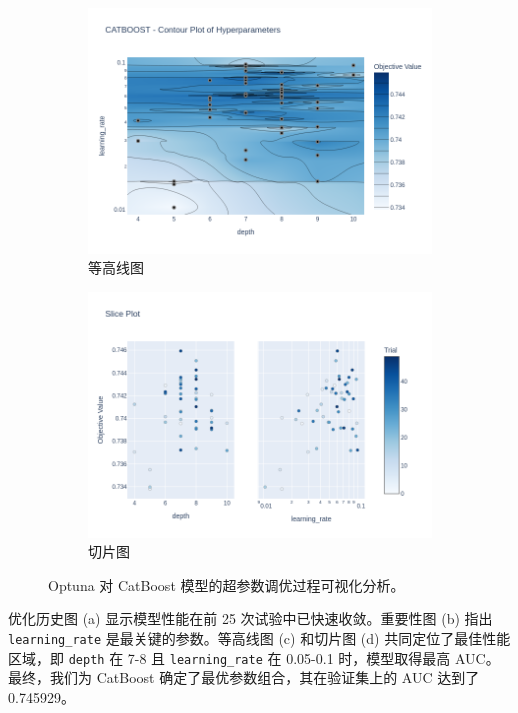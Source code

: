 \documentclass{thuemp}
\begin{document}
\begin{figure}[H]
    \vspace{0.5cm}

    \begin{subfigure}[b]{0.49\textwidth}
        \centering
        \includegraphics[width=\textwidth]{image/results/catboost_contour_plot.png} %
        \caption{等高线图}
        \label{fig:cat_contour}
    \end{subfigure}
    \hfill
    \begin{subfigure}[b]{0.49\textwidth}
        \centering
        \includegraphics[width=\textwidth]{image/results/catboost_param_vs_target_slice.png} %
        \caption{切片图}
        \label{fig:cat_slice}
    \end{subfigure}
    
    \caption{Optuna 对 CatBoost 模型的超参数调优过程可视化分析。}
    \label{fig:optuna_catboost}
\end{figure}
优化历史图 (a) 显示模型性能在前 25 次试验中已快速收敛。重要性图 (b) 指出 \texttt{learning\_rate} 是最关键的参数。等高线图 (c) 和切片图 (d) 共同定位了最佳性能区域，即 \texttt{depth} 在 7-8 且 \texttt{learning\_rate} 在 0.05-0.1 时，模型取得最高 AUC。最终，我们为 CatBoost 确定了最优参数组合，其在验证集上的 AUC 达到了  0.745929。
\end{document}
